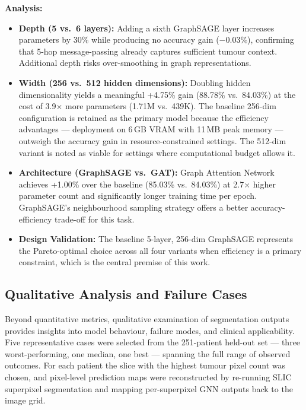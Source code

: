 \textbf{Analysis:}
\begin{itemize}
    \item \textbf{Depth (5 vs.\ 6 layers):} Adding a sixth GraphSAGE layer increases parameters by 30\% while producing no accuracy gain ($-$0.03\%), confirming that 5-hop message-passing already captures sufficient tumour context. Additional depth risks over-smoothing in graph representations.

    \item \textbf{Width (256 vs.\ 512 hidden dimensions):} Doubling hidden dimensionality yields a meaningful +4.75\% gain (88.78\% vs.\ 84.03\%) at the cost of 3.9$\times$ more parameters (1.71M vs.\ 439K). The baseline 256-dim configuration is retained as the primary model because the efficiency advantages — deployment on 6\,GB VRAM with 11\,MB peak memory — outweigh the accuracy gain in resource-constrained settings. The 512-dim variant is noted as viable for settings where computational budget allows it.

    \item \textbf{Architecture (GraphSAGE vs.\ GAT):} Graph Attention Network achieves +1.00\% over the baseline (85.03\% vs.\ 84.03\%) at 2.7$\times$ higher parameter count and significantly longer training time per epoch. GraphSAGE's neighbourhood sampling strategy offers a better accuracy-efficiency trade-off for this task.

    \item \textbf{Design Validation:} The baseline 5-layer, 256-dim GraphSAGE represents the Pareto-optimal choice across all four variants when efficiency is a primary constraint, which is the central premise of this work.
\end{itemize}


\subsection{Qualitative Analysis and Failure Cases}

Beyond quantitative metrics, qualitative examination of segmentation outputs provides insights into model behaviour, failure modes, and clinical applicability. Five representative cases were selected from the 251-patient held-out set — three worst-performing, one median, one best — spanning the full range of observed outcomes. For each patient the slice with the highest tumour pixel count was chosen, and pixel-level prediction maps were reconstructed by re-running SLIC superpixel segmentation and mapping per-superpixel GNN outputs back to the image grid.

